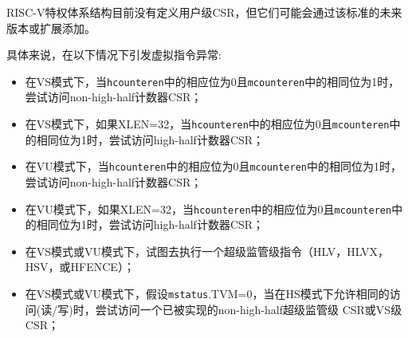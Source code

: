 \begin{commentary}
  RISC-V特权体系结构目前没有定义用户级CSR，但它们可能会通过该标准的未来版本或扩展添加。
\end{commentary}

具体来说，在以下情况下引发虚拟指令异常:
\begin{itemize}

\item
在VS模式下，当{\tt hcounteren}中的相应位为0且{\tt mcounteren}中的相同位为1时，尝试访问non-high-half计数器CSR；

\item
在VS模式下，如果XLEN=32，当{\tt hcounteren}中的相应位为0且{\tt mcounteren}中的相同位为1时，尝试访问high-half计数器CSR；

\item
在VU模式下，当{\tt hcounteren}中的相应位为0且{\tt mcounteren}中的相同位为1时，尝试访问non-high-half计数器CSR；

\item
在VU模式下，如果XLEN=32，当{\tt hcounteren}中的相应位为0且{\tt mcounteren}中的相同位为1时，尝试访问high-half计数器CSR；

\item
在VS模式或VU模式下，试图去执行一个超级监管级指令（HLV，HLVX，HSV，或HFENCE）；

\item
在VS模式或VU模式下，假设{\tt mstatus}.TVM=0，当在HS模式下允许相同的访问(读/写)时，尝试访问一个已被实现的non-high-half超级监管级 CSR或VS级 CSR；


\end{itemize}
